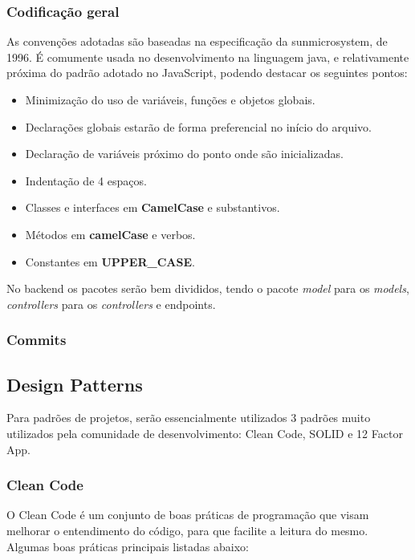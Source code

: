 \subsubsection{Codificação geral}
As convenções adotadas são baseadas na especificação da \gls{sunmicrosystem}, de 1996. É comumente usada no desenvolvimento na linguagem java, e relativamente próxima do padrão adotado no JavaScript, podendo destacar os seguintes pontos:

\begin{itemize}
    \item Minimização do uso de variáveis, funções e objetos globais.
    \item Declarações globais estarão de forma preferencial no início do arquivo.
    \item Declaração de variáveis próximo do ponto onde são inicializadas.
    \item Indentação de 4 espaços.
    \item Classes e interfaces em \textbf{CamelCase} e substantivos.
    \item Métodos em \textbf{camelCase} e verbos.
    \item Constantes em \textbf{UPPER\_CASE}.
\end{itemize}

No \gls{backend} os pacotes serão bem divididos, tendo o pacote \emph{model} para os \emph{models}, \emph{controllers} para os \emph{controllers} e \glspl{endpoint}.

\subsubsection{Commits}


\subsection{Design Patterns}
Para padrões de projetos, serão essencialmente utilizados 3 padrões muito utilizados pela comunidade de desenvolvimento: Clean Code, SOLID e 12 Factor App.

\subsubsection{Clean Code}
O Clean Code é um conjunto de boas práticas de programação que visam melhorar o entendimento do código, para que facilite a leitura do mesmo. Algumas boas práticas principais listadas abaixo:

